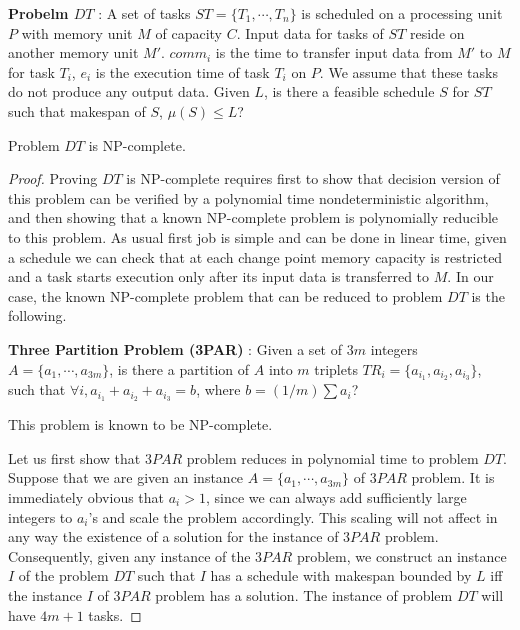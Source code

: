 \documentclass[runningheads]{llncs} %
\begin{document}
	
	\noindent\textbf{Probelm  $DT$} : A set of tasks $ST=\{T_1, \cdots, T_n\}$ is scheduled on a processing 
	unit $P$  with memory unit $M$ of capacity $C$. Input data for tasks of $ST$ reside on 
	another memory unit $M'$. $comm_i$ is the time to transfer input data from $M'$ to $M$ for task 
	$T_i$,  $e_i$ is the execution time of task $T_i$ on $P$. We assume that these tasks  do not produce any output data.  Given $L$, is there a feasible schedule $S$ for $ST$ such that makespan of $S$, $\mu(S) \le L$?
	\begin{theorem}
		Problem $DT$ is NP-complete.
	\end{theorem}
   \begin{proof}
   	
   	Proving $DT$ is NP-complete requires first to show that decision version of this problem can be 
   	verified by a polynomial time nondeterministic algorithm, and then showing that a known 
   	NP-complete problem is polynomially reducible to this problem. As usual first job is simple and can 
   	be 
   	done in linear time, given a schedule we can check that at each change point memory capacity is 
   	restricted and a task starts execution only after its input data is transferred to $M$. In our case, the 
   	known NP-complete problem that can be reduced to problem $DT$ is the following.
   	
   	
   	\noindent \textbf{Three Partition Problem (3PAR)} : Given a set of $3m$ integers $A = \{ a_1,  
   	\cdots, a_{3m }\}$, is there a partition of $A$ into $m$ triplets $TR_i = \{a_{i_1}, a_{i_2}, a_{i_3}\}$, 
   	such that $\forall i, a_{i_1} + a_{i_2}  + a_{i_3}  = b$, where $b=(1/m) \sum a_i $?
   	
   	This problem is known to be NP-complete.
   	
   	
   	\noindent Let us first show that $3PAR$ problem reduces in polynomial time to problem $DT$.  
   	Suppose that we 
   	are given an instance  $A = \{ a_1,  \cdots, a_{3m }\}$ of $3PAR$ problem. It is immediately obvious 
   	that $a_i>1$, since we can always add sufficiently large integers to $a_i$'s and scale the problem 
   	accordingly.  This scaling will not affect in any way the existence of a solution for the instance of $3PAR$ problem. Consequently, given any instance of the $3PAR$ problem, we construct an instance $I$ of the problem $DT$ such that $I$ has a schedule with makespan bounded by $L$ iff the instance 
   	$I$ of $3PAR$ problem has a solution. The instance of problem $DT$ will have $4m+1$ tasks.
   	

\end{proof}
\end{document}
